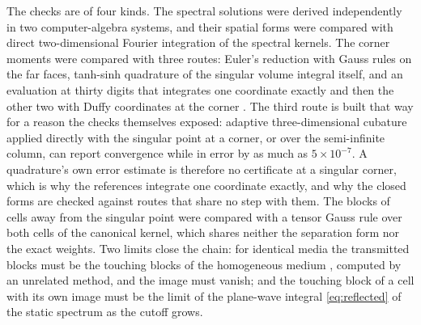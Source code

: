 \documentclass[11pt,a4paper]{article}
\begin{document}
The checks are of four kinds. The spectral solutions were derived independently in two computer-algebra
systems, and their spatial forms were compared with direct two-dimensional Fourier integration of the
spectral kernels. The corner moments were compared with three routes: Euler's reduction with Gauss rules on
the far faces, tanh-sinh quadrature of the singular volume integral itself, and an evaluation at thirty
digits that integrates one coordinate exactly and then the other two with Duffy coordinates at the corner
\citep{Duffy1982}. The third route is built that way for a reason the checks themselves exposed: adaptive
three-dimensional cubature applied directly with the singular point at a corner, or over the semi-infinite
column, can report convergence while in error by as much as $5\times10^{-7}$. A quadrature's own error
estimate is therefore no certificate at a singular corner, which is why the references integrate one
coordinate exactly, and why the closed forms are checked against routes that share no step with them. The blocks of cells away from
the singular point were compared with a tensor Gauss rule over both cells of the canonical kernel, which
shares neither the separation form nor the exact weights. Two limits close the chain: for identical media
the transmitted blocks must be the touching blocks of the homogeneous medium \citep{NestorCoupling2026},
computed by an unrelated method, and the image must vanish; and the touching block of a cell with its own
image must be the limit of the plane-wave integral \eqref{eq:reflected} of the static spectrum as the
cutoff grows.
\end{document}
